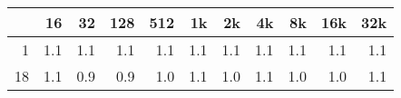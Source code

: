 \begin{tabular}{r | r r r r r r r r r r}
 	 &16	 &32	 &128	 &512	 &1k	 &2k	 &4k	 &8k	 &16k	 &32k	\\ \hline
1	& 1.1	& 1.1	& 1.1	& 1.1	& 1.1	& 1.1	& 1.1	& 1.1	& 1.1	& 1.1	\\
18	& 1.1	& 0.9	& 0.9	& 1.0	& 1.1	& 1.0	& 1.1	& 1.0	& 1.0	& 1.1	\\
\end{tabular}
